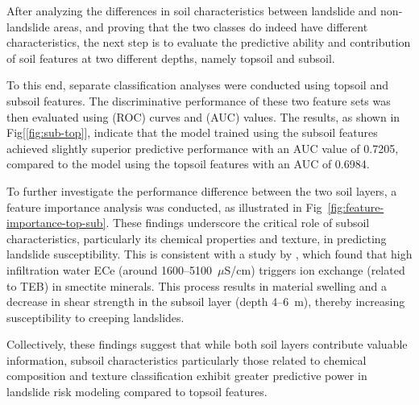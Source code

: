 After analyzing the differences in soil characteristics between landslide and non-landslide areas, and proving that the two classes do indeed have different characteristics, the next step is to evaluate the predictive ability and contribution of soil features at two different depths, namely topsoil and subsoil. 

To this end, separate classification analyses were conducted using topsoil and subsoil features. The discriminative performance of these two feature sets was then evaluated using (ROC) curves and (AUC) values. The results, as shown in Fig[\ref{fig:sub-top}], indicate that the model trained using the subsoil features achieved slightly superior predictive performance with an AUC value of 0.7205, compared to the model using the topsoil features with an AUC of 0.6984.

To further investigate the performance difference between the two soil layers, a feature importance analysis was conducted, as illustrated in Fig~\ref{fig:feature-importance-top-sub}. These findings underscore the critical role of subsoil characteristics, particularly its chemical properties and texture, in predicting landslide susceptibility. This is consistent with a study by \cite{reslt02}, which found that high infiltration water ECe (around 1600--5100~$\mu$S/cm) triggers ion exchange (related to TEB) in smectite minerals. This process results in material swelling and a decrease in shear strength in the subsoil layer (depth 4--6~m), thereby increasing susceptibility to creeping landslides.

Collectively, these findings suggest that while both soil layers contribute valuable information, subsoil characteristics particularly those related to chemical composition and texture classification exhibit greater predictive power in landslide risk modeling compared to topsoil features.

